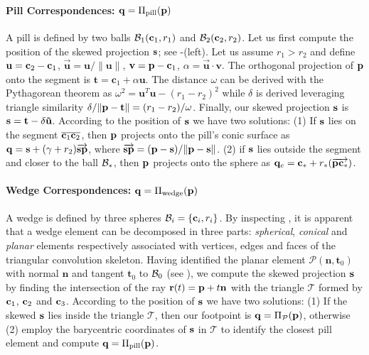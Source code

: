 \paragraph{Pill Correspondences: $\mathbf{q}=\Pi_\text{pill}(\mathbf{p})$}
A pill is defined by two balls $\mathcal{B}_1(\mathbf{c}_1,r_1)$ and $\mathcal{B}_2(\mathbf{c}_2,r_2)$. Let us first compute the position of the skewed projection $\mathbf{s}$; see -(left). 
% 
Let us assume $r_1 > r_2$ and define $\mathbf{u} = \mathbf{c}_2-\mathbf{c}_1$, $\mathbf{\vec{u}} = \mathbf{u}/\|\mathbf{u}\|$, $\mathbf{v} = \mathbf{p}-\mathbf{c}_1$, $\alpha=\mathbf{\vec{u}} \cdot \mathbf{v}$. The orthogonal projection of $\mathbf{p}$ onto the segment is $\mathbf{t} = \mathbf{c}_1 + \alpha \mathbf{u}$. The distance $\omega$ can be derived with the Pythagorean theorem as $\omega^2 = \mathbf{u}^T \mathbf{u} - (r_1 - r_2)^2$ while $\delta$ is derived leveraging triangle similarity $\delta / \| \mathbf{p} - \mathbf{t} \| = (r_1-r_2)/\omega$. Finally, our skewed projection $\mathbf{s}$ is $\mathbf{s} = \mathbf{t} - \delta \mathbf{\vec{u}}$.
% 
According to the position of $\mathbf{s}$ we have two solutions: 
(1) If $\mathbf{s}$ lies on the segment $\overline{\mathbf{c}_1 \mathbf{c}_2}$, then $\mathbf{p}$ projects onto the pill's conic surface as $\mathbf{q}=\mathbf{s}+(\gamma+r_2) \overrightarrow{\mathbf{\mathbf{s}} \mathbf{p}}$, where $\overrightarrow{\mathbf{s} \mathbf{p}} = (\mathbf{p}-\mathbf{s})/ \|\mathbf{p}-\mathbf{s}\|$. 
(2) if $\mathbf{s}$ lies outside the segment and closer to the ball $\mathcal{B}_*$, then $\mathbf{p}$ projects onto the sphere as $\mathbf{q}_e = \mathbf{c}_* + r_*(\overrightarrow{\mathbf{p} \mathbf{c}_*})$. 

\paragraph{Wedge Correspondences: $\mathbf{q}=\Pi_\text{wedge}(\mathbf{p})$}
A wedge is defined by three spheres $\mathcal{B}_i = \{\mathbf{c}_i, r_i\}$. By inspecting , it is apparent that a wedge element can be decomposed in three parts: \emph{spherical}, \emph{conical} and \emph{planar} elements respectively associated with vertices, edges and faces of the triangular convolution skeleton. Having identified the planar element $\mathcal{P}(\mathbf{n}, \mathbf{t}_0)$ with normal $\mathbf{n}$ and tangent $\mathbf{t}_0$ to $\mathcal{B}_0$ (see ), we compute the skewed projection $\mathbf{s}$ by finding the intersection of the ray $\mathbf{r}(t) = \mathbf{p} + t\mathbf{n}$ with the triangle $\mathcal{T}$ formed by $\mathbf{c}_1$, $\mathbf{c}_2$ and $\mathbf{c}_3$. 
% 
According to the position of $\mathbf{s}$ we have two solutions:
(1) If the skewed $\mathbf{s}$ lies inside the triangle $\mathcal{T}$, then our footpoint is $\mathbf{q} = \Pi_\mathcal{P}(\mathbf{p})$, otherwise 
(2) employ the barycentric coordinates of $\mathbf{s}$ in $\mathcal{T}$ to identify the closest pill element and compute $\mathbf{q}=\Pi_\text{pill}(\mathbf{p})$.


